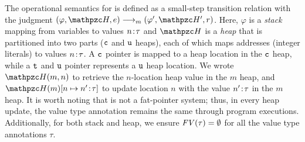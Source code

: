 

The operational semantics for \lang is defined as a small-step
transition relation with the judgment $ (\varphi,\heap,e)
\longrightarrow_m (\varphi',\heap',r)$.
 Here, $\varphi$ is a
\emph{stack} mapping from variables to values ${n}\!:\!{\tau}$ and
$\heap$ is a \emph{heap} that is partitioned into two parts ($\texttt{c}$ and $\texttt{u}$ heaps), each of which
maps addresses (integer literals) to values ${n}\!:\!{\tau}$.
A $\texttt{c}$ pointer is mapped to a heap location in the $\texttt{c}$ heap, 
while a $\texttt{t}$ and $\texttt{u}$ pointer represents a $\texttt{u}$ heap location.
We wrote $\heap(m,n)$ to retrieve the $n$-location heap value in the $m$ heap,
and $\heapup{m}{n}{\evalue{n'}{\tau}}$ 
to update location $n$ with the value ${n'}\!:\!{\tau}$ in the $m$ heap.
It is worth noting that \systemname is not a fat-pointer system;
thus, in every heap update, the value type annotation remains the same through program executions.
Additionally, for both stack and heap, 
we ensure $\mathit{FV}(\tau)=\emptyset$ for all the value type annotations $\tau$.

